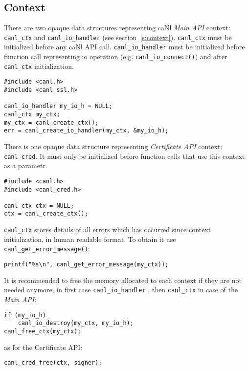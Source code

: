 \subsection{Context}
\label{s:canl_ctx}
%
There are two opaque data structures representing 
caNl \textit{Main API} context: {\tt canl\_ctx} and
 {\tt canl\_io\_handler} (see section~\ref{s:context}).
{\tt canl\_ctx} must be initialized before any caNl API call.
{\tt canl\_io\_handler} must be initialized before function call 
representing io operation (e.g. \verb'canl_io_connect()') and after
{\tt canl\_ctx} initialization. 
\begin{lstlisting}
#include <canl.h>
#include <canl_ssl.h>

canl_io_handler my_io_h = NULL;
canl_ctx my_ctx;
my_ctx = canl_create_ctx();
err = canl_create_io_handler(my_ctx, &my_io_h);
\end{lstlisting}
There is one opaque data structure representing \CANL 
\textit{Certificate API} context: {\tt canl\_cred}.
It must only be initialized before function calls
that use this context as a parametr.
\begin{lstlisting}
#include <canl.h>
#include <canl_cred.h>

canl_ctx ctx = NULL;
ctx = canl_create_ctx();
\end{lstlisting}
%
{\tt canl\_ctx} stores details of all errors which has occurred since 
context initialization, in human readable format. To obtain it use 
\verb'canl_get_error_message()':
\begin{lstlisting}
printf("%s\n", canl_get_error_message(my_ctx));
\end{lstlisting}

%
It is recommended to free the memory allocated to each 
context if they are not needed anymore, in first case {\tt canl\_io\_handler}
, then {\tt canl\_ctx} in case of the \textit{Main API}:
\begin{lstlisting}
if (my_io_h)
	canl_io_destroy(my_ctx, my_io_h);
canl_free_ctx(my_ctx);
\end{lstlisting}
as for the Certificate API:
\begin{lstlisting}
canl_cred_free(ctx, signer);
\end{lstlisting}
